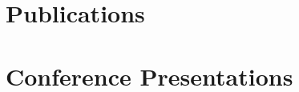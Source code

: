 \documentclass[11pt,a4paper,sans]{moderncv}   %
\begin{document}
\section{Publications}
\renewcommand{\refname}{Non-Refereed Articles}
\nocite{*}


\section{Conference Presentations}
\newenvironment{fakebib}
{\par\leftskip=0.25in \parindent=-\leftskip}
{\par}
\end{document}
